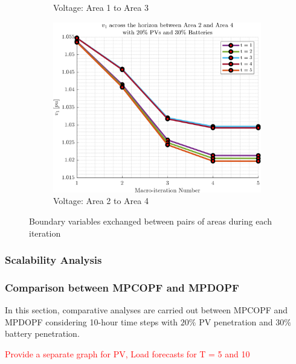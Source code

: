 \documentclass[../../outputs/main.tex]{subfiles}
\begin{document}
\begin{figure}[h!]
\begin{subfigure}[b]{0.3\textwidth}
        \caption{\scriptsize Voltage: Area 1 to Area 3}
        \label{fig:voltage_1_3}
    \end{subfigure}
    \hfill
    \begin{subfigure}[b]{0.3\textwidth}
        \centering
        \includegraphics[width=\textwidth]{../figures/T5-pv20-batt30-genCost/dopf/convergenceCurves/BoundaryVoltage_vs_t_vs_macroItr_T_5_Areas_2_4_genCost_pv_20_batt_30_.png}
        \caption{\scriptsize Voltage: Area 2 to Area 4}
        \label{fig:voltage_2_4}
    \end{subfigure}

    \caption{Boundary variables exchanged between pairs of areas during each iteration}
    \label{fig:boundary_variables_all}
\end{figure}


\subsubsection{Scalability Analysis}

\subsubsection{Comparison between MPCOPF and MPDOPF}
In this section, comparative analyses are carried out between MPCOPF and MPDOPF considering 10-hour time steps with $20\%$ PV penetration and $30\%$ battery penetration.

\textcolor{red}{Provide a separate graph for PV, Load forecasts for T = 5 and 10}
\end{document}
